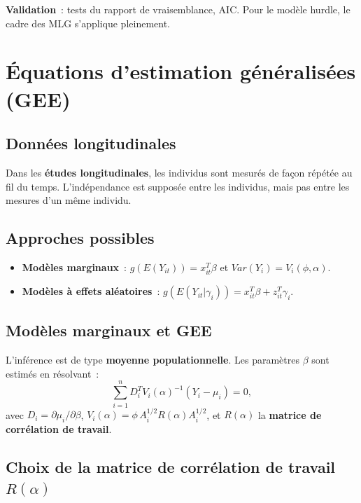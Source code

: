 \documentclass[11pt,letterpaper]{article}
\begin{document}
\textbf{Validation}~: tests du rapport de vraisemblance, AIC. Pour le modèle hurdle, le cadre des MLG s'applique pleinement.

\newpage
\section{Équations d'estimation généralisées (GEE)}

\subsection{Données longitudinales}

Dans les \textbf{études longitudinales}, les individus sont mesurés de façon répétée au fil du temps. L'indépendance est supposée entre les individus, mais pas entre les mesures d'un même individu.

\subsection{Approches possibles}

\begin{itemize}
\item \textbf{Modèles marginaux}~: $g(E(Y_{it})) = x_{it}^T \beta$ et $Var(Y_i) = V_i(\phi,\alpha)$.
\item \textbf{Modèles à effets aléatoires}~: $g(E(Y_{it}|\gamma_i)) = x_{it}^T \beta + z_{it}^T \gamma_i$.
\end{itemize}

\subsection{Modèles marginaux et GEE}

L'inférence est de type \textbf{moyenne populationnelle}. Les paramètres $\beta$ sont estimés en résolvant~:
$$\sum_{i=1}^n D_i^T V_i(\alpha)^{-1}(Y_i - \mu_i) = 0,$$
avec $D_i = \partial \mu_i/\partial \beta$, $V_i(\alpha) = \phi\, A_i^{1/2} R(\alpha) A_i^{1/2}$, et $R(\alpha)$ la \textbf{matrice de corrélation de travail}.

\subsection{Choix de la matrice de corrélation de travail $R(\alpha)$}
\end{document}
